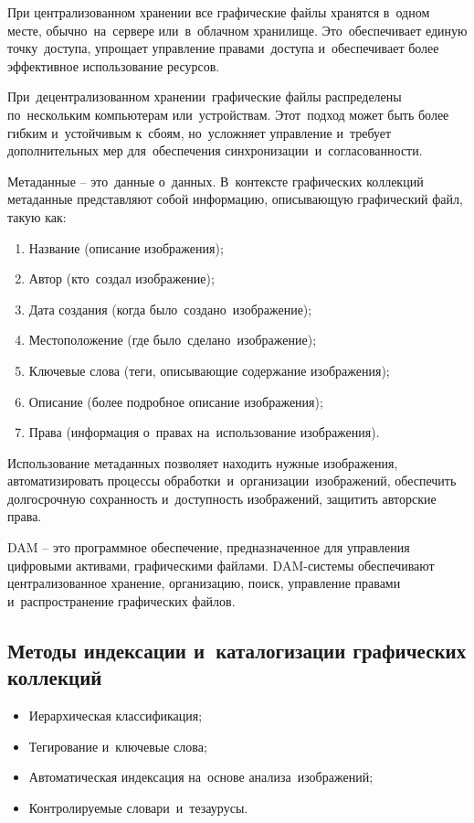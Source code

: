 \documentclass{ou}
\begin{document}
 При централизованном хранении все графические файлы хранятся в~одном месте, обычно~на~сервере или~в~облачном хранилище. Это~обеспечивает единую точку~доступа, упрощает управление правами~доступа и~обеспечивает более эффективное использование ресурсов.

При~децентрализованном хранении~графические файлы распределены по~нескольким компьютерам или~устройствам. Этот~подход может быть более гибким и~устойчивым к~сбоям, но~усложняет управление и~требует дополнительных мер для~обеспечения синхронизации~и~согласованности.

Метаданные -- это~данные о~данных. В~контексте графических коллекций метаданные представляют собой информацию, описывающую графический файл, такую как:
\begin{enumerate}[leftmargin=0em, itemindent=3.75em, nosep, label=\arabic*)]
\item Название (описание изображения);
\item Автор (кто~создал изображение);
\item Дата создания (когда было~создано~изображение);
\item Местоположение (где было~сделано~изображение);
\item Ключевые слова (теги, описывающие содержание изображения);
\item Описание (более подробное описание изображения);
\item Права (информация о~правах на~использование изображения).
\end{enumerate}

Использование метаданных позволяет находить нужные изображения, автоматизировать процессы обработки~и~организации~изображений, обеспечить долгосрочную сохранность и~доступность изображений, защитить авторские права.

DAM -- это программное обеспечение, предназначенное для управления цифровыми активами, графическими файлами. DAM-системы обеспечивают централизованное хранение, организацию, поиск, управление правами и~распространение графических файлов.
\subsection{Методы индексации и~каталогизации графических коллекций}
\begin{itemize}[label=-, leftmargin=0em, itemindent=3.35em, nosep]
\item Иерархическая классификация;
\item Тегирование и~ключевые слова;
\item Автоматическая индексация на~основе анализа~изображений;
\item Контролируемые словари~и~тезаурусы.
\end{itemize}
\end{document}
